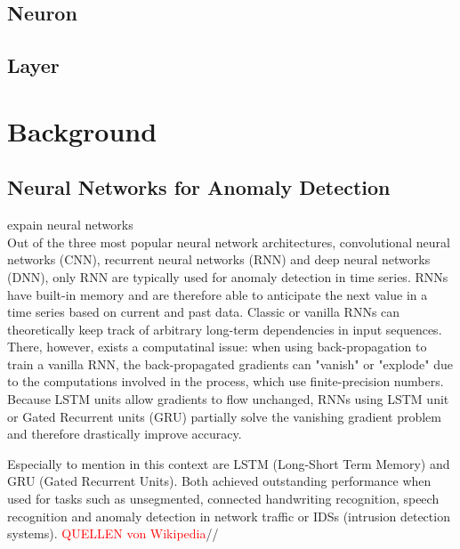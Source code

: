 \subsection{Neuron}

\subsection{Layer}



\section{Background}

\subsection{Neural Networks for Anomaly Detection}


expain neural networks\\

Out of the three most popular neural network architectures, convolutional neural networks (CNN), recurrent neural networks (RNN) and deep neural networks (DNN), only RNN are typically used for anomaly detection in time series. RNNs have built-in memory and are therefore able to anticipate the next value in a time series based on current and past data. Classic or vanilla RNNs can theoretically keep track of arbitrary long-term dependencies in input sequences. There, however, exists a computatinal issue: when using back-propagation to train a vanilla RNN, the back-propagated gradients can "vanish" or "explode" due to the computations involved in the process, which use finite-precision numbers. Because LSTM units allow gradients to flow unchanged, RNNs using LSTM unit or Gated Recurrent units (GRU) partially solve the vanishing gradient problem and therefore drastically improve accuracy.

Especially to mention in this context are LSTM (Long-Short Term Memory) and GRU (Gated Recurrent Units). Both achieved outstanding performance when used for tasks such as unsegmented, connected handwriting recognition, speech recognition and anomaly detection in network traffic or IDSs (intrusion detection systems). \textcolor{red}{QUELLEN von Wikipedia}//



